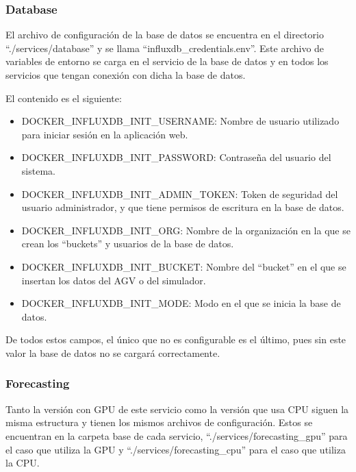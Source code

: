 \subsubsection{Database}
El archivo de configuración de la base de datos se encuentra en el directorio ``./services/database'' 
y se llama ``influxdb\_credentials.env''. Este archivo de variables de entorno se carga en el servicio 
de la base de datos y en todos los servicios que tengan conexión con dicha la base de datos.

El contenido es el siguiente:
\begin{itemize}
    \item DOCKER\_INFLUXDB\_INIT\_USERNAME: Nombre de usuario utilizado para iniciar sesión en la aplicación web.
    \item DOCKER\_INFLUXDB\_INIT\_PASSWORD: Contraseña del usuario del sistema.
    \item DOCKER\_INFLUXDB\_INIT\_ADMIN\_TOKEN: Token de seguridad del usuario administrador, y que tiene permisos 
        de escritura en la base de datos.
    \item DOCKER\_INFLUXDB\_INIT\_ORG: Nombre de la organización en la que se crean los ``buckets'' y usuarios de
        la base de datos.
    \item DOCKER\_INFLUXDB\_INIT\_BUCKET: Nombre del ``bucket'' en el que se insertan los datos del AGV o del simulador.
    \item DOCKER\_INFLUXDB\_INIT\_MODE: Modo en el que se inicia la base de datos.
\end{itemize}
De todos estos campos, el único que no es configurable es el último, pues sin este valor la base de datos 
no se cargará correctamente.

\subsubsection{Forecasting}

Tanto la versión con GPU de este servicio como la versión que usa CPU siguen la misma estructura 
y tienen los mismos archivos de configuración. Estos se encuentran en la carpeta base de cada servicio,
``./services/forecasting\_gpu'' para el caso que utiliza la GPU y ``./services/forecasting\_cpu'' para 
el caso que utiliza la CPU. 

